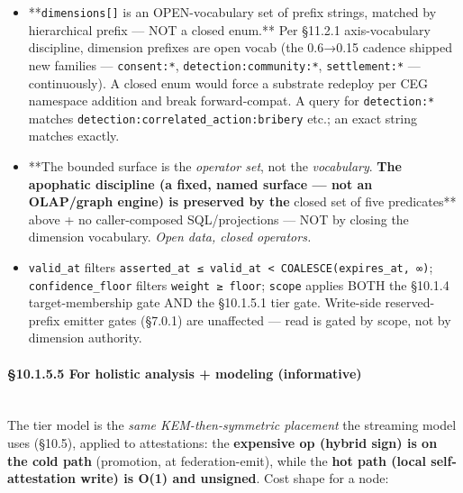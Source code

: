 \documentclass[10pt]{article}
\begin{document}
\begin{itemize}\setlength\itemsep{0pt}
\item **\texttt{dimensions[]} is an OPEN-vocabulary set of prefix strings, matched by hierarchical prefix — NOT a closed enum.** Per §11.2.1 axis-vocabulary discipline, dimension prefixes are open vocab (the 0.6→0.15 cadence shipped new families — \texttt{consent:*}, \texttt{detection:community:*}, \texttt{settlement:*} — continuously). A closed enum would force a substrate redeploy per CEG namespace addition and break forward-compat. A query for \texttt{detection:*} matches \texttt{detection:correlated\_action:bribery} etc.; an exact string matches exactly.
\item **The bounded surface is the \textit{operator set}, not the \textit{vocabulary}.\textbf{ The apophatic discipline (a fixed, named surface — not an OLAP/graph engine) is preserved by the }closed set of five predicates** above + no caller-composed SQL/projections — NOT by closing the dimension vocabulary. \textit{Open data, closed operators.}
\item \texttt{valid\_at} filters \texttt{asserted\_at ≤ valid\_at < COALESCE(expires\_at, ∞)}; \texttt{confidence\_floor} filters \texttt{weight ≥ floor}; \texttt{scope} applies BOTH the §10.1.4 target-membership gate AND the §10.1.5.1 tier gate. Write-side reserved-prefix emitter gates (§7.0.1) are unaffected — read is gated by scope, not by dimension authority.
\end{itemize}


\paragraph{§10.1.5.5 For holistic analysis + modeling (informative)}\mbox{}\\


The tier model is the \textit{same KEM-then-symmetric placement} the streaming model uses (§10.5), applied to attestations: the \textbf{expensive op (hybrid sign) is on the cold path} (promotion, at federation-emit), while the \textbf{hot path (local self-attestation write) is O(1) and unsigned}. Cost shape for a node:
\end{document}
